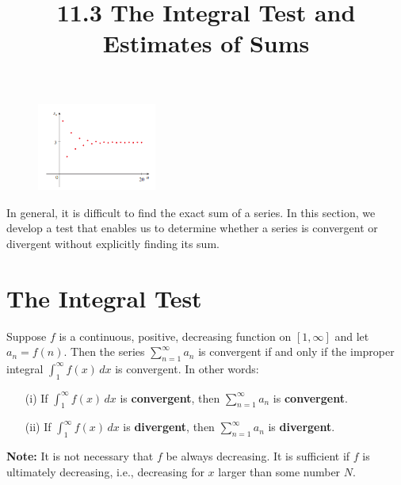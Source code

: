 \documentclass{article}
\title{11.3 The Integral Test and Estimates of Sums}
\date{}
\author{}
\begin{document}
\maketitle

\begin{figure}[htbp]
    \centering
    \includegraphics[width=0.35\textwidth]{graph72.png}
\end{figure} 

In general, it is difficult to find the exact sum of a series. In this section, we develop a test that enables us to determine whether a series is convergent or divergent without explicitly finding its sum.

\section*{The Integral Test}

\begin{tcolorbox}[
    colback=white,
    colframe=orange!80!white,
    title=The Integral Test,
    boxrule=0.5mm,
    arc=3mm
    ]
    Suppose \(f\) is a continuous, positive, decreasing function on \([1, \infty]\) and let \(a_n = f(n)\). Then the series \( \sum_{n=1}^{\infty} a_n \) is convergent if and only if the improper integral \( \int_1^\infty f(x) \,dx \) is convergent. In other words:
    \begin{itemize}
        \item[(i)] If \( \int_1^\infty f(x) \,dx \) is \textbf{convergent}, then \( \sum_{n=1}^{\infty} a_n \) is \textbf{convergent}.
        \item[(ii)] If \( \int_1^\infty f(x) \,dx \) is \textbf{divergent}, then \( \sum_{n=1}^{\infty} a_n \) is \textbf{divergent}.
    \end{itemize}
    \textbf{Note:} It is not necessary that \(f\) be always decreasing. It is sufficient if \(f\) is ultimately decreasing, i.e., decreasing for \(x\) larger than some number \(N\).
\end{tcolorbox}
\end{document}
